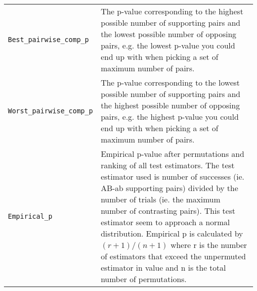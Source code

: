 \begin{longtable}{l|X}
  \verb+Best_pairwise_comp_p+ & The p-value corresponding to the highest possible number of supporting pairs and the lowest possible number of opposing pairs, e.g. the lowest p-value you could end up with when picking a set of maximum number of pairs. \\
  \verb+Worst_pairwise_comp_p+ & The p-value corresponding to the lowest possible number of supporting pairs and the highest possible number of opposing pairs, e.g. the highest p-value you could end up with when picking a set of maximum number of pairs. \\
  \verb+Empirical_p+ & Empirical p-value after permutations and ranking of all test estimators. The test estimator used is number of successes (ie. AB-ab supporting pairs) divided by the number of trials (ie. the maximum number of contrasting pairs). This test estimator seem to approach a normal distribution. Empirical p is calculated by $(r+1)/(n+1)$ where r is the number of estimators that exceed the unpermuted estimator in value and n is the total number of permutations. \\
  \bottomrule
\end{longtable}